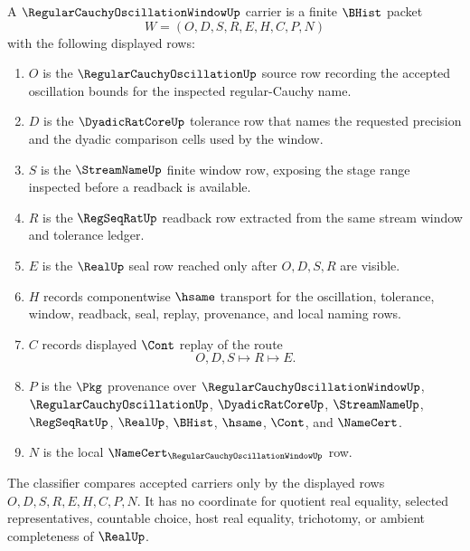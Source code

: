 \begin{definition}
\label{def:regular-cauchy-oscillation-window-carrier}
A $\RegularCauchyOscillationWindowUp$ carrier is a finite $\BHist$ packet
$$
W=(O,D,S,R,E,H,C,P,N)
$$
with the following displayed rows:
\begin{enumerate}
\item $O$ is the $\RegularCauchyOscillationUp$ source row recording the accepted oscillation bounds for the inspected regular-Cauchy name.
\item $D$ is the $\DyadicRatCoreUp$ tolerance row that names the requested precision and the dyadic comparison cells used by the window.
\item $S$ is the $\StreamNameUp$ finite window row, exposing the stage range inspected before a readback is available.
\item $R$ is the $\RegSeqRatUp$ readback row extracted from the same stream window and tolerance ledger.
\item $E$ is the $\RealUp$ seal row reached only after $O,D,S,R$ are visible.
\item $H$ records componentwise $\hsame$ transport for the oscillation, tolerance, window, readback, seal, replay, provenance, and local naming rows.
\item $C$ records displayed $\Cont$ replay of the route
$$
O,D,S \longmapsto R \longmapsto E .
$$
\item $P$ is the $\Pkg$ provenance over $\RegularCauchyOscillationWindowUp$, $\RegularCauchyOscillationUp$, $\DyadicRatCoreUp$, $\StreamNameUp$, $\RegSeqRatUp$, $\RealUp$, $\BHist$, $\hsame$, $\Cont$, and $\NameCert$.
\item $N$ is the local $\NameCert_{\RegularCauchyOscillationWindowUp}$ row.
\end{enumerate}
The classifier compares accepted carriers only by the displayed rows $O,D,S,R,E,H,C,P,N$. It has no coordinate for quotient real equality, selected representatives, countable choice, host real equality, trichotomy, or ambient completeness of $\RealUp$.
\end{definition}

